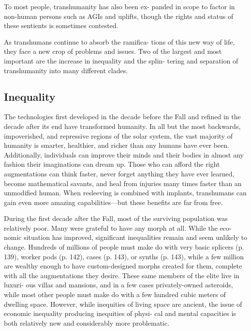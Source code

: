 To most people, transhumanity has also been ex-
panded in scope to factor in non-human persons such 
as AGIs and uplifts, though the rights and status of 
these sentients is sometimes contested.

As transhumans continue to absorb the ramifica-
tions of this new way of life, they face a new crop 
of problems and issues. Two of the largest and most 
important are the increase in inequality and the splin-
tering and separation of transhumanity into many 
different clades.

\subsection{Inequality}

The technologies first developed in the decade before 
the Fall and refined in the decade after its end have 
transformed humanity. In all but the most backwards, 
impoverished, and repressive regions of the solar 
system, the vast majority of humanity is smarter, 
healthier, and richer than any humans 
have ever been. Additionally, individuals 
can improve their minds and their bodies 
in almost any fashion their imaginations 
can dream up. Those who can afford the 
right augmentations can think faster, never 
forget anything they have ever learned, 
become mathematical savants, and heal 
from injuries many times faster than an 
unmodified human. When resleeving is 
combined with implants, transhumans can 
gain even more amazing capabilities—but 
these benefits are far from free.

During the first decade after the Fall, 
most of the surviving population was 
relatively poor. Many were grateful to 
have any morph at all. While the eco-
nomic situation has improved, significant 
inequalities remain and seem unlikely to 
change. Hundreds of millions of people 
must make do with very basic splicers (p. 
139), worker pods (p. 142), cases (p. 143), 
or synths (p. 143), while a few million are 
wealthy enough to have custom-designed 
morphs created for them, complete with 
all the augmentations they desire. These 
same members of the elite live in luxuri-
ous villas and mansions, and in a few 
cases privately-owned asteroids, while 
most other people must make do with 
a few hundred cubic meters of dwelling 
space. However, while inequities of living 
space are ancient, the issue of economic 
inequality producing inequities of physi-
cal and mental capacities is both relatively 
new and considerably more problematic.

